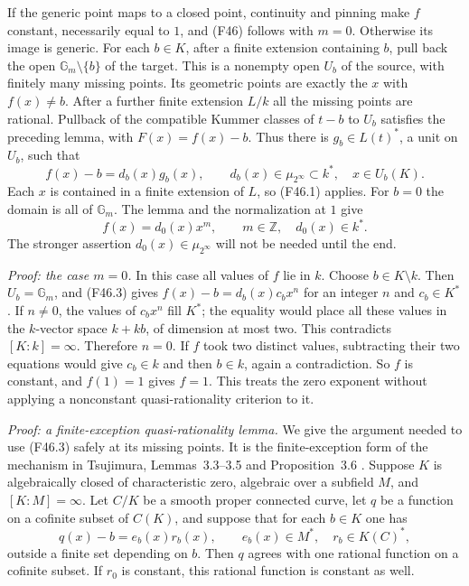If the generic point maps to a closed point, continuity and pinning
make $f$ constant, necessarily equal to $1$, and (F46) follows with
$m=0$. Otherwise its image is generic. For each $b\in K$, after a
finite extension containing $b$, pull back the open
$\mathbb G_m\setminus\{b\}$ of the target. This is a nonempty
open $U_b$ of the source, with finitely many missing points. Its
geometric points are exactly the $x$ with $f(x)\ne b$.
After a further finite extension $L/k$ all the missing points are
rational. Pullback of the compatible Kummer classes of $t-b$ to
$U_b$ satisfies the preceding lemma, with $F(x)=f(x)-b$.
Thus there is $g_b\in L(t)^*$, a unit on $U_b$, such that
\[
 f(x)-b=d_b(x)g_b(x),\qquad d_b(x)\in\mu_{2^\infty}\subset k^*,
       \quad x\in U_b(K).                                  \tag{F46.3}
\]
Each $x$ is contained in a finite extension of $L$, so (F46.1)
applies. For $b=0$ the domain is all of $\mathbb G_m$. The lemma
and the normalization at $1$ give
\[
 f(x)=d_0(x)x^m,\qquad m\in\mathbb Z,\quad d_0(x)\in k^*.
                                                               \tag{F46.4}
\]
The stronger assertion $d_0(x)\in\mu_{2^\infty}$ will not be needed
until the end.

\emph{Proof: the case $m=0$.}
In this case all values of $f$ lie in $k$. Choose $b\in K\setminus k$.
Then $U_b=\mathbb G_m$, and (F46.3) gives
$f(x)-b=d_b(x)c_bx^n$ for an integer $n$ and $c_b\in K^*$.
If $n\ne0$, the values of $c_bx^n$ fill $K^*$; the equality would
place all these values in the $k$-vector space $k+kb$, of dimension
at most two. This contradicts $[K:k]=\infty$.
Therefore $n=0$. If $f$ took two distinct values, subtracting their
two equations would give $c_b\in k$ and then $b\in k$, again a
contradiction. So $f$ is constant, and $f(1)=1$ gives $f=1$.
This treats the zero exponent without applying a nonconstant
quasi-rationality criterion to it.

\emph{Proof: a finite-exception quasi-rationality lemma.}
We give the argument needed to use (F46.3) safely at its missing
points. It is the finite-exception form of the mechanism in
Tsujimura, Lemmas~3.3--3.5 and Proposition~3.6
\cite{Tsujimura2022}.
Suppose $K$ is algebraically closed of characteristic zero, algebraic over a subfield $M$,
and $[K:M]=\infty$. Let $C/K$ be a smooth proper connected curve,
let $q$ be a function on a cofinite subset of $C(K)$, and suppose
that for each $b\in K$ one has
\[
 q(x)-b=e_b(x)r_b(x),\qquad e_b(x)\in M^*,\quad r_b\in K(C)^*,
                                                               \tag{F46.5}
\]
outside a finite set depending on $b$. Then $q$ agrees with one
rational function on a cofinite subset. If $r_0$ is constant, this
rational function is constant as well.

